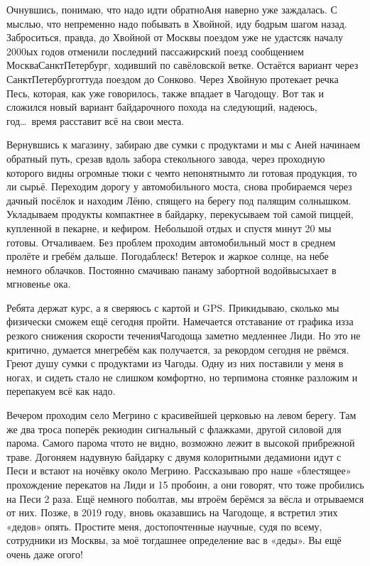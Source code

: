 Очнувшись, понимаю, что надо идти обратно\mdash Аня наверно уже заждалась. С мыслью, что непременно надо побывать в Хвойной, иду бодрым шагом назад. Заброситься, правда, до Хвойной от Москвы поездом уже не удастся\mdash к началу 2000\sdash ых годов отменили последний пассажирский поезд сообщением Москва\mdash Санкт\sdash Петербург, ходивший по савёловской ветке. Остаётся вариант через Санкт\sdash Петербург\mdash оттуда поездом до Сонково. Через Хвойную протекает речка Песь, которая, как уже говорилось, также впадает в Чагодощу. Вот так и сложился новый вариант байдарочного похода на следующий, надеюсь, год\ldots~время расставит всё на свои места.

Вернувшись к магазину, забираю две сумки с продуктами и мы с Аней начинаем обратный путь, срезав вдоль забора стекольного завода, через проходную которого видны огромные тюки с чем\sdash то непонятным\mdash то ли готовая продукция, то ли сырьё. Переходим дорогу у автомобильного моста, снова пробираемся через дачный посёлок и находим Лёню, спящего на берегу под палящим солнышком. Укладываем продукты компактнее в байдарку, перекусываем той самой пиццей, купленной в пекарне, и кефиром. Небольшой отдых и спустя минут 20 мы готовы. Отчаливаем. Без проблем проходим автомобильный мост в среднем пролёте и гребём дальше. Погода\mdash блеск! Ветерок и жаркое солнце, на небе немного облачков. Постоянно смачиваю панаму забортной водой\mdash высыхает в мгновенье ока. 

Ребята держат курс, а я сверяюсь с картой и GPS. Прикидываю, сколько мы физически сможем ещё сегодня пройти. Намечается отставание от графика из\sdash за резкого снижения скорости течения\mdash Чагодоща заметно медленнее Лиди. Но это не критично, думается мне\mdash гребём как получается, за рекордом сегодня не рвёмся. Греют душу сумки с продуктами из Чагоды. Одну из них поставили у меня в ногах, и сидеть стало не слишком комфортно, но терпимо\mdash на стоянке разложим и перепакуем всё как надо. 

Вечером проходим село Мегрино с красивейшей церковью на левом берегу. Там же два троса поперёк реки\mdash один сигнальный с флажками, другой силовой для парома. Самого парома что\sdash то не видно, возможно лежит в высокой прибрежной траве. Догоняем надувную байдарку с двумя колоритными дедами\mdash они идут с Песи и встают на ночёвку около Мегрино. Рассказываю про наше «блестящее» прохождение перекатов на Лиди и 15 пробоин, а они говорят, что тоже пробились на Песи 2 раза. Ещё немного поболтав, мы втроём берёмся за вёсла и отрываемся от них. Позже, в 2019 году, вновь оказавшись на Чагодоще, я встретил этих «дедов» опять. Простите меня, достопочтенные научные, судя по всему, сотрудники из Москвы, за моё тогдашнее определение вас в «деды». Вы ещё очень даже ого\sdash го!

